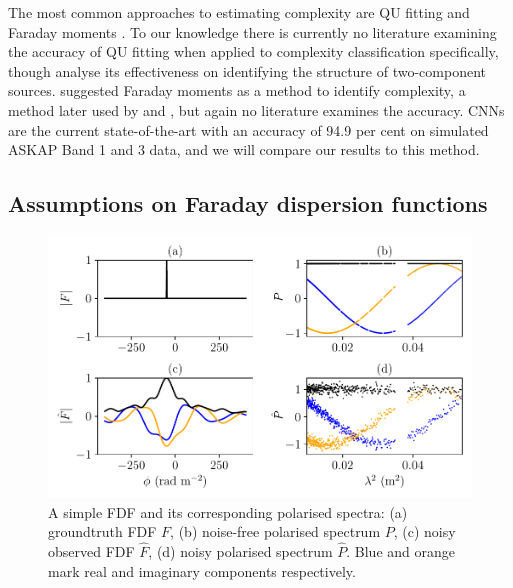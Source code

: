       The most common approaches to estimating complexity are QU fitting \citep[e.g.][]{osullivan_broad-band_2017} and Faraday moments \citep[e.g.][]{anderson_broadband_2015}. To our knowledge there is currently no literature examining the accuracy of QU fitting when applied to complexity classification specifically, though \citet{miyashita19qu} analyse its effectiveness on identifying the structure of two-component sources. \citet{Brown11report} suggested Faraday moments as a method to identify complexity, a method later used by \citet{farnes14broadband} and \citet{anderson_broadband_2015}, but again no literature examines the accuracy. CNNs are the current state-of-the-art with an accuracy of 94.9 per cent \citep{brown_classifying_2018} on simulated ASKAP Band 1 and 3 data, and we will compare our results to this method.

  \subsection{Assumptions on Faraday dispersion functions}
  \label{sec:faraday-fdfs}

    \begin{figure}
      \includegraphics[width=\linewidth]{faraday-images/spectra_simple.pdf}
      \caption{A simple FDF and its corresponding polarised spectra: (a) groundtruth FDF $F$, (b) noise-free polarised spectrum $P$, (c) noisy observed FDF $\hat F$, (d) noisy polarised spectrum $\hat P$. Blue and orange mark real and imaginary components respectively.}
      \label{fig:simple-fdf}
    \end{figure}

